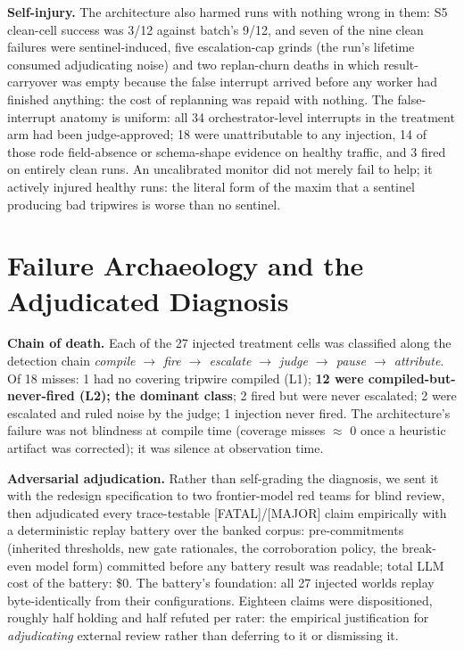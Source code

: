 \documentclass[acmsmall,screen,review,anonymous]{acmart}
\begin{document}
\textbf{Self-injury.} The architecture also harmed runs with nothing wrong in them: S5 clean-cell success was 3/12 against batch's 9/12, and seven of the nine clean failures were sentinel-induced, five escalation-cap grinds (the run's lifetime consumed adjudicating noise) and two replan-churn deaths in which result-carryover was empty because the false interrupt arrived before any worker had finished anything: the cost of replanning was repaid with nothing. The false-interrupt anatomy is uniform: all 34 orchestrator-level interrupts in the treatment arm had been judge-approved; 18 were unattributable to any injection, 14 of those rode field-absence or schema-shape evidence on healthy traffic, and 3 fired on entirely clean runs. An uncalibrated monitor did not merely fail to help; it actively injured healthy runs: the literal form of the maxim that a sentinel producing bad tripwires is worse than no sentinel.

\section{Failure Archaeology and the Adjudicated Diagnosis}
\textbf{Chain of death.} Each of the 27 injected treatment cells was classified along the detection chain \emph{compile $\rightarrow$ fire $\rightarrow$ escalate $\rightarrow$ judge $\rightarrow$ pause $\rightarrow$ attribute}. Of 18 misses: 1 had no covering tripwire compiled (L1); \textbf{12 were compiled-but-never-fired (L2); the dominant class}; 2 fired but were never escalated; 2 were escalated and ruled noise by the judge; 1 injection never fired. The architecture's failure was not blindness at compile time (coverage misses $\approx$ 0 once a heuristic artifact was corrected); it was silence at observation time.

\textbf{Adversarial adjudication.} Rather than self-grading the diagnosis, we sent it with the redesign specification to two frontier-model red teams for blind review, then adjudicated every trace-testable [FATAL]/[MAJOR] claim empirically with a deterministic replay battery over the banked corpus: pre-commitments (inherited thresholds, new gate rationales, the corroboration policy, the break-even model form) committed before any battery result was readable; total LLM cost of the battery: \$0. The battery's foundation: all 27 injected worlds replay byte-identically from their configurations. Eighteen claims were dispositioned, roughly half holding and half refuted per rater: the empirical justification for \emph{adjudicating} external review rather than deferring to it or dismissing it.
\end{document}
